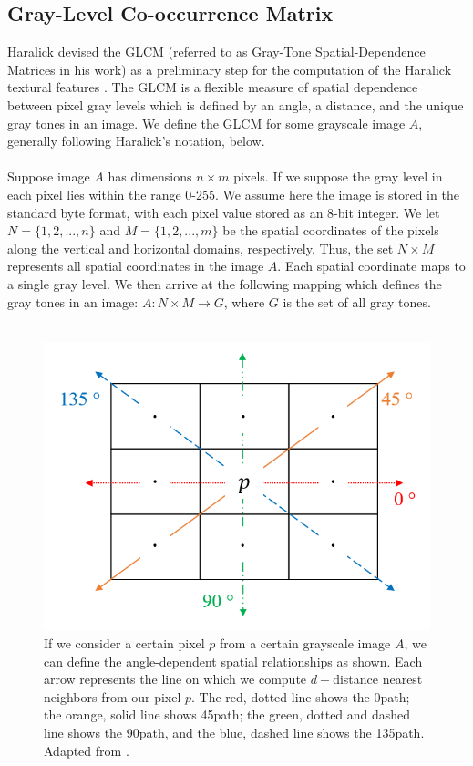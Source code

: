 \documentclass{article}
\begin{document}
\subsection{Gray-Level Co-occurrence Matrix}
    Haralick devised the GLCM (referred to as Gray-Tone Spatial-Dependence Matrices in his work) as a preliminary step for the computation of the Haralick textural features \cite{haralick}. The GLCM is a flexible measure of spatial dependence between pixel gray levels which is defined by an angle, a distance, and the unique gray tones in an image. We define the GLCM for some grayscale image $A$, generally following Haralick's notation, below. \\ \\
    Suppose image $A$ has dimensions $n \times m$ pixels. If we suppose the gray level in each pixel lies within the range 0-255. We assume here the image is stored in the standard byte format, with each pixel value stored as an 8-bit integer. We let $N = \{ 1, 2, ..., n\}$ and $M = \{1, 2, ..., m\}$ be the spatial coordinates of the pixels along the vertical and horizontal domains, respectively. Thus, the set $N \times M $ represents all spatial coordinates in the image $A$. Each spatial coordinate maps to a single gray level. We then arrive at the following mapping which defines the gray tones in an image: $ A:  N \times M \to G$, where $G$ is the set of all gray tones. \\ \\
        \begin{figure}[t]
      \includegraphics[width=\linewidth]{direction_fig.PNG}
      \caption{If we consider a certain pixel $p$ from a certain grayscale image $A$, we can define the angle-dependent spatial relationships as shown. Each arrow represents the line on which we compute $d-$distance nearest neighbors from our pixel $p$. The red, dotted line shows the 0\textdegree  path; the orange, solid line shows 45\textdegree  path; the green, dotted and dashed line shows the 90\textdegree  path, and the blue, dashed line shows the 135\textdegree  path. Adapted from \cite{haralick}. }
      \label{fig:directions}
    \end{figure}
\end{document}
